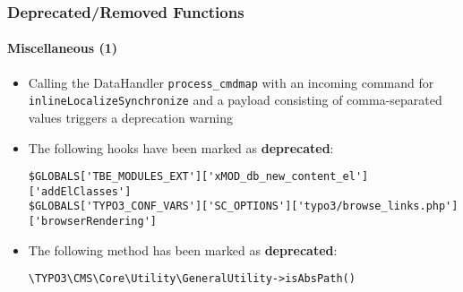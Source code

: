 %

\begin{frame}[fragile]
	\frametitle{Deprecated/Removed Functions}
	\framesubtitle{Miscellaneous (1)}


	\begin{itemize}
		\item Calling the DataHandler \texttt{process\_cmdmap} with an incoming
			command for \texttt{inlineLocalizeSynchronize} and a payload
			consisting of comma-separated values triggers a deprecation warning

		\item The following hooks have been marked as \textbf{deprecated}:
\begin{lstlisting}
$GLOBALS['TBE_MODULES_EXT']['xMOD_db_new_content_el']['addElClasses']
$GLOBALS['TYPO3_CONF_VARS']['SC_OPTIONS']['typo3/browse_links.php']['browserRendering']
\end{lstlisting}

		\item The following method has been marked as \textbf{deprecated}:
\begin{lstlisting}
\TYPO3\CMS\Core\Utility\GeneralUtility->isAbsPath()
\end{lstlisting}

	\end{itemize}

\end{frame}

